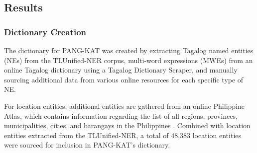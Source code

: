 \documentclass[journal]{./IEEE/IEEEtran}
\begin{document}
\subsection {Results}

\subsubsection{Dictionary Creation}

The dictionary for PANG-KAT was created by extracting Tagalog named entities (NEs) from the TLUnified-NER corpus, multi-word expressions (MWEs) from an online Tagalog dictionary using a Tagalog Dictionary Scraper, and manually sourcing additional data from various online resources for each specific type of NE. \\

\begin{table}[H]
    \centering %
    \captionsetup{justification=centering}
    \caption{The dictionary size and composition of PANG-KAT.}  \label{tab:effects}
    \vspace{1mm} %

    \renewcommand{\arraystretch}{1.5}
    \fontsize{12pt}{12pt}\selectfont
\end{table}

For location entities, additional entities are gathered from an online Philippine Atlas, which contains information regarding the list of all regions, provinces, municipalities, cities, and barangays in the Philippines {\cite{PhilAtlas}}. Combined with location entities extracted from the TLUnified-NER, a total of 48,383 location entities were sourced for inclusion in PANG-KAT's dictionary. \\
\end{document}
